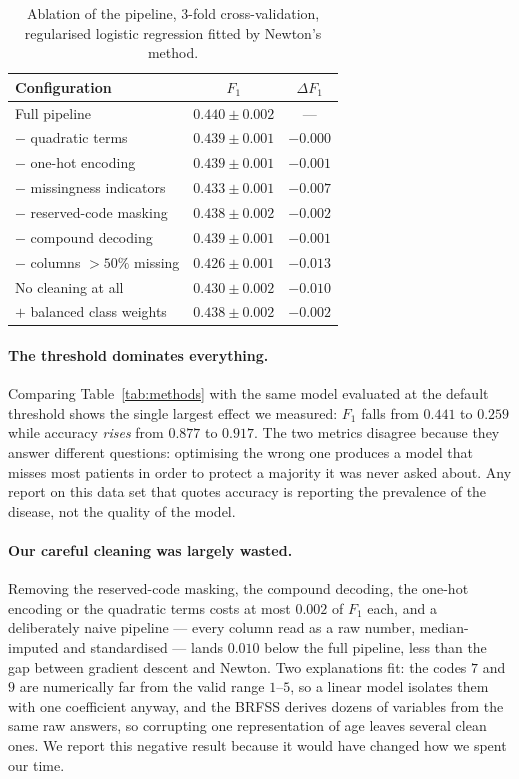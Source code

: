 \documentclass[10pt,conference,compsocconf]{IEEEtran}
\begin{document}
\begin{table}[t]
\centering
\caption{Ablation of the pipeline, 3-fold cross-validation, regularised
logistic regression fitted by Newton's method.}
\label{tab:ablation}
\small
\begin{tabular}{lcc}
\toprule
Configuration & $F_1$ & $\Delta F_1$ \\
\midrule
Full pipeline & $0.440 \pm 0.002$ & --- \\
$-$ quadratic terms & $0.439 \pm 0.001$ & $-0.000$ \\
$-$ one-hot encoding & $0.439 \pm 0.001$ & $-0.001$ \\
$-$ missingness indicators & $0.433 \pm 0.001$ & $-0.007$ \\
$-$ reserved-code masking & $0.438 \pm 0.002$ & $-0.002$ \\
$-$ compound decoding & $0.439 \pm 0.001$ & $-0.001$ \\
$-$ columns $>50\%$ missing & $0.426 \pm 0.001$ & $-0.013$ \\
No cleaning at all & $0.430 \pm 0.002$ & $-0.010$ \\
$+$ balanced class weights & $0.438 \pm 0.002$ & $-0.002$ \\
\bottomrule
\end{tabular}
\end{table}

\paragraph{The threshold dominates everything.} Comparing
Table~\ref{tab:methods} with the same model evaluated at the default threshold
shows the single largest effect we measured: $F_1$ falls from $0.441$ to
$0.259$ while accuracy \emph{rises} from $0.877$ to $0.917$. The two metrics
disagree because they answer different questions: optimising the wrong one
produces a model that misses most patients in order to protect a majority it
was never asked about. Any report on this data set that quotes accuracy is
reporting the prevalence of the disease, not the quality of the model.

\paragraph{Our careful cleaning was largely wasted.} Removing the reserved-code
masking, the compound decoding, the one-hot encoding or the quadratic terms
costs at most $0.002$ of $F_1$ each, and a deliberately naive pipeline --- every
column read as a raw number, median-imputed and standardised --- lands $0.010$
below the full pipeline, less than the gap between gradient descent and Newton.
Two explanations fit: the codes $7$ and $9$ are numerically far from the valid
range $1$--$5$, so a linear model isolates them with one coefficient anyway,
and the BRFSS derives dozens of variables from the same raw answers, so
corrupting one representation of age leaves several clean ones. We report this
negative result because it would have changed how we spent our time.
\end{document}

